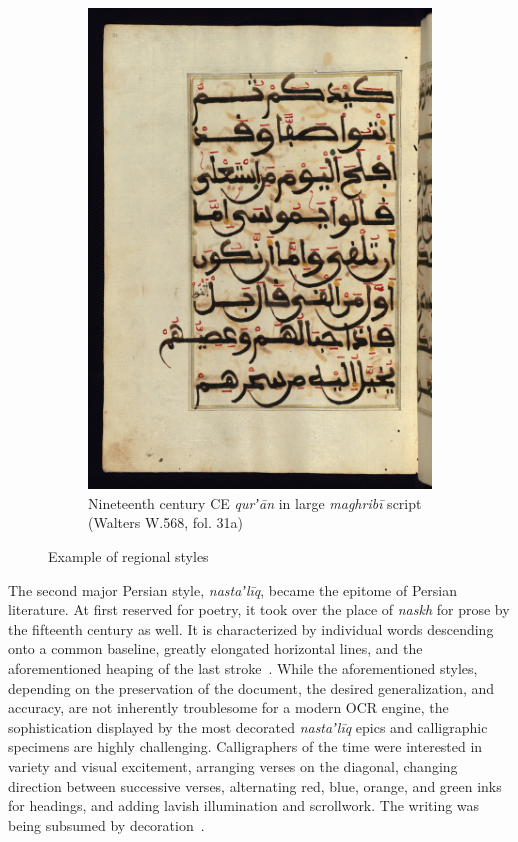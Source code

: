 \begin{figure}[h!tp]
\begin{subfigure}[t]{.48\textwidth}
                \includegraphics[width=\textwidth]{images/W568_000064_sap.jpg}
		\caption{Nineteenth century CE \emph{qurʼān} in large \emph{maghribī} script (Walters W.568, fol. 31a)}
                \label{fig:ara_maghribi}
        \end{subfigure}
        \caption{Example of regional styles}
\end{figure}


The second major Persian style, \emph{nastaʼlīq}, became the epitome of Persian
literature. At first reserved for poetry, it took over the place of
\emph{naskh} for prose by the fifteenth century as well. It is characterized by
individual words descending onto a common baseline, greatly elongated
horizontal lines, and the aforementioned heaping of the last stroke~\cite[pg.
166-167]{gacek2009arabic}. While the aforementioned styles, depending on the
preservation of the document, the desired generalization, and accuracy, are not
inherently troublesome for a modern OCR engine, the sophistication displayed by
the most decorated \emph{nastaʼlīq} epics and calligraphic specimens are highly
challenging. Calligraphers of the time were interested in variety and visual
excitement, arranging verses on the diagonal, changing direction between
successive verses, alternating red, blue, orange, and green inks for headings,
and adding lavish illumination and scrollwork. The writing was being subsumed
by decoration~\cite[pg. 436]{blair2006islamic}. 

